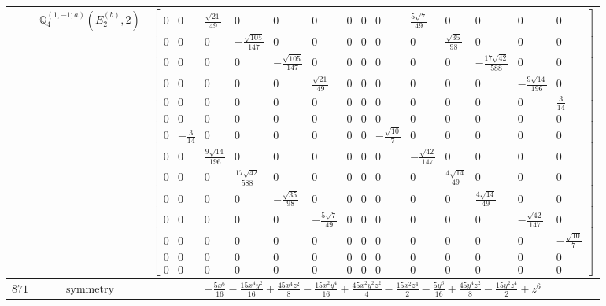 \documentclass[fleqn,8pt,landscape]{jsarticle}
\begin{document}
\begin{longtable}{ccc}
$  $ & $ \mathbb{Q}_{4}^{(1,-1;a)}(E_{2}^{(b)},2) $ & $ \begin{bmatrix} 0 & 0 & \frac{\sqrt{21}}{49} & 0 & 0 & 0 & 0 & 0 & 0 & \frac{5 \sqrt{7}}{49} & 0 & 0 & 0 & 0 \\ 0 & 0 & 0 & - \frac{\sqrt{105}}{147} & 0 & 0 & 0 & 0 & 0 & 0 & \frac{\sqrt{35}}{98} & 0 & 0 & 0 \\ 0 & 0 & 0 & 0 & - \frac{\sqrt{105}}{147} & 0 & 0 & 0 & 0 & 0 & 0 & - \frac{17 \sqrt{42}}{588} & 0 & 0 \\ 0 & 0 & 0 & 0 & 0 & \frac{\sqrt{21}}{49} & 0 & 0 & 0 & 0 & 0 & 0 & - \frac{9 \sqrt{14}}{196} & 0 \\ 0 & 0 & 0 & 0 & 0 & 0 & 0 & 0 & 0 & 0 & 0 & 0 & 0 & \frac{3}{14} \\ 0 & 0 & 0 & 0 & 0 & 0 & 0 & 0 & 0 & 0 & 0 & 0 & 0 & 0 \\ 0 & - \frac{3}{14} & 0 & 0 & 0 & 0 & 0 & 0 & - \frac{\sqrt{10}}{7} & 0 & 0 & 0 & 0 & 0 \\ 0 & 0 & \frac{9 \sqrt{14}}{196} & 0 & 0 & 0 & 0 & 0 & 0 & - \frac{\sqrt{42}}{147} & 0 & 0 & 0 & 0 \\ 0 & 0 & 0 & \frac{17 \sqrt{42}}{588} & 0 & 0 & 0 & 0 & 0 & 0 & \frac{4 \sqrt{14}}{49} & 0 & 0 & 0 \\ 0 & 0 & 0 & 0 & - \frac{\sqrt{35}}{98} & 0 & 0 & 0 & 0 & 0 & 0 & \frac{4 \sqrt{14}}{49} & 0 & 0 \\ 0 & 0 & 0 & 0 & 0 & - \frac{5 \sqrt{7}}{49} & 0 & 0 & 0 & 0 & 0 & 0 & - \frac{\sqrt{42}}{147} & 0 \\ 0 & 0 & 0 & 0 & 0 & 0 & 0 & 0 & 0 & 0 & 0 & 0 & 0 & - \frac{\sqrt{10}}{7} \\ 0 & 0 & 0 & 0 & 0 & 0 & 0 & 0 & 0 & 0 & 0 & 0 & 0 & 0 \\ 0 & 0 & 0 & 0 & 0 & 0 & 0 & 0 & 0 & 0 & 0 & 0 & 0 & 0 \end{bmatrix} $ \\ \hline
$ 871 $ & $ \text{symmetry} $ & $ - \frac{5 x^{6}}{16} - \frac{15 x^{4} y^{2}}{16} + \frac{45 x^{4} z^{2}}{8} - \frac{15 x^{2} y^{4}}{16} + \frac{45 x^{2} y^{2} z^{2}}{4} - \frac{15 x^{2} z^{4}}{2} - \frac{5 y^{6}}{16} + \frac{45 y^{4} z^{2}}{8} - \frac{15 y^{2} z^{4}}{2} + z^{6} $ \\

\end{longtable}
\end{document}
